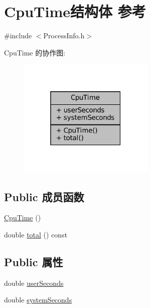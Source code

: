 \hypertarget{structmuduo_1_1ProcessInfo_1_1CpuTime}{}\section{Cpu\+Time结构体 参考}
\label{structmuduo_1_1ProcessInfo_1_1CpuTime}


{\ttfamily \#include $<$Process\+Info.\+h$>$}



Cpu\+Time 的协作图\+:
\nopagebreak
\begin{figure}[H]
\begin{center}
\leavevmode
\includegraphics[width=184pt]{structmuduo_1_1ProcessInfo_1_1CpuTime__coll__graph}
\end{center}
\end{figure}
\subsection*{Public 成员函数}
\begin{DoxyCompactItemize}
\item 
\hyperlink{structmuduo_1_1ProcessInfo_1_1CpuTime_a832b9a727992c901b09e084c145cd3a3}{Cpu\+Time} ()
\item 
double \hyperlink{structmuduo_1_1ProcessInfo_1_1CpuTime_ae994bf616ecbe36d46839d0e62de0389}{total} () const
\end{DoxyCompactItemize}
\subsection*{Public 属性}
\begin{DoxyCompactItemize}
\item 
double \hyperlink{structmuduo_1_1ProcessInfo_1_1CpuTime_afa8d4e0eb7afbb352a903a1232687f4a}{user\+Seconds}
\item 
double \hyperlink{structmuduo_1_1ProcessInfo_1_1CpuTime_ab2589af68d8cd283041de10b63c6eb31}{system\+Seconds}
\end{DoxyCompactItemize}



